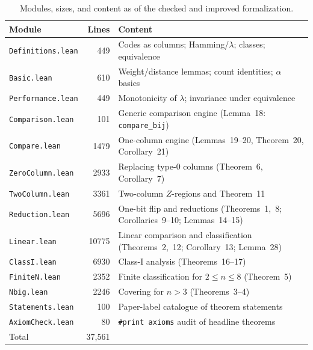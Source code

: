 \documentclass[12pt]{article}
\newcommand{\leanfile}[1]{\nolinkurl{#1}}
\begin{document}
\begin{table}[t]
  \centering
  \caption{Modules, sizes, and content as of the checked and improved
  formalization.}
  \label{tab:modules}
  \small
  \begin{tabular}{@{}lrp{}@{}}
  \toprule
  \textbf{Module} & \textbf{Lines} & \textbf{Content} \\
  \midrule
  \leanfile{Definitions.lean} & 449 &
    Codes as columns; Hamming/\(\lambda\); classes; equivalence \\
  \leanfile{Basic.lean} & 610 &
    Weight/distance lemmas; count identities; \(\alpha\) basics \\
  \leanfile{Performance.lean} & 449 &
    Monotonicity of \(\lambda\); invariance under equivalence \\
  \leanfile{Comparison.lean} & 101 &
    Generic comparison engine (Lemma~18: \texttt{compare\_bij}) \\
  \leanfile{Compare.lean} & 1479 &
    One-column engine (Lemmas~19--20, Theorem~20, Corollary~21) \\
  \leanfile{ZeroColumn.lean} & 2933 &
    Replacing type-0 columns (Theorem~6, Corollary~7) \\
  \leanfile{TwoColumn.lean} & 3361 &
    Two-column \(Z\)-regions and Theorem~11 \\
  \leanfile{Reduction.lean} & 5696 &
    One-bit flip and reductions (Theorems~1,~8; Corollaries~9--10; Lemmas~14--15) \\
  \leanfile{Linear.lean} & 10775 &
    Linear comparison and classification (Theorems~2,~12; Corollary~13; Lemma~28) \\
  \leanfile{ClassI.lean} & 6930 &
    Class-I analysis (Theorems~16--17) \\
  \leanfile{FiniteN.lean} & 2352 &
    Finite classification for \(2\le n\le 8\) (Theorem~5) \\
  \leanfile{Nbig.lean} & 2246 &
    Covering for \(n>3\) (Theorems~3--4) \\
  \leanfile{Statements.lean} & 100 &
    Paper-label catalogue of theorem statements \\
  \leanfile{AxiomCheck.lean} & 80 &
    \texttt{\#print axioms} audit of headline theorems \\
  \midrule
  Total & 37{,}561 & \\
  \bottomrule
  \end{tabular}
  \end{table}
\end{document}
